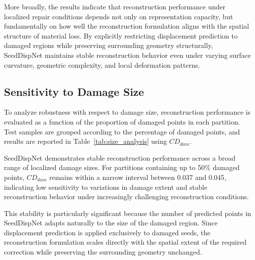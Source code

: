 More broadly, the results indicate that reconstruction performance under localized repair conditions depends not only on representation capacity, but fundamentally on how well the reconstruction formulation aligns with the spatial structure of material loss. By explicitly restricting displacement prediction to damaged regions while preserving surrounding geometry structurally, SeedDispNet maintains stable reconstruction behavior even under varying surface curvature, geometric complexity, and local deformation patterns.

\subsection{Sensitivity to Damage Size}
\label{sec:sens_size_results}

To analyze robustness with respect to damage size, reconstruction performance is evaluated as a function of the proportion of damaged points in each partition. Test samples are grouped according to the percentage of damaged points, and results are reported in Table~\ref{tab:size_analysis} using ${CD}_{dam}$.

\begin{table}[h]
\small
\centering
\caption{Reconstruction performance across damage size ranges. $\text{CD}_\text{dam}$~[mm] (mean).}
\label{tab:size_analysis}
\end{table}

SeedDispNet demonstrates stable reconstruction performance across a broad range of localized damage sizes. For partitions containing up to 50\% damaged points, ${CD}_{dam}$ remains within a narrow interval between 0.037 and 0.045, indicating low sensitivity to variations in damage extent and stable reconstruction behavior under increasingly challenging reconstruction conditions.

This stability is particularly significant because the number of predicted points in SeedDispNet adapts naturally to the size of the damaged region. Since displacement prediction is applied exclusively to damaged seeds, the reconstruction formulation scales directly with the spatial extent of the required correction while preserving the surrounding geometry unchanged.

